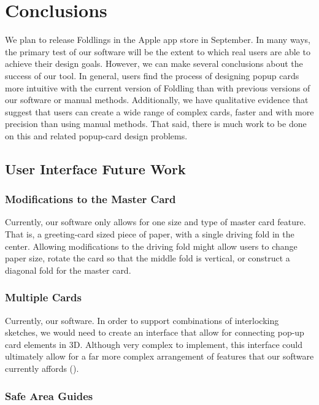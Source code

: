 \chapter{Conclusions}

We plan to release Foldlings in the Apple app store in September. In
many ways, the primary test of our software will be the extent to which
real users are able to achieve their design goals. However, we can make
several conclusions about the success of our tool. In general, users
find the process of designing popup cards more intuitive with the
current version of Foldling than with previous versions of our software
or manual methods. Additionally, we have qualitative evidence that
suggest that users can create a wide range of complex cards, faster and
with more precision than using manual methods. That said, there is much
work to be done on this and related popup-card design problems.

\section{User Interface Future Work}\label{user-interface-future-work}

\subsection{Modifications to the Master
Card}\label{modifications-to-the-master-card}

Currently, our software only allows for one size and type of master card
feature. That is, a greeting-card sized piece of paper, with a single
driving fold in the center. Allowing modifications to the driving fold
might allow users to change paper size, rotate the card so that the
middle fold is vertical, or construct a diagonal fold for the master
card.

\subsection{Multiple Cards}\label{multiple-cards}

Currently, our software. In order to support combinations of
interlocking sketches, we would need to create an interface that allow
for connecting pop-up card elements in 3D. Although very complex to
implement, this interface could ultimately allow for a far more complex
arrangement of features that our software currently affords
(\citet{hart2007modular}).

\subsection{Safe Area Guides}\label{safe-area-guides}

